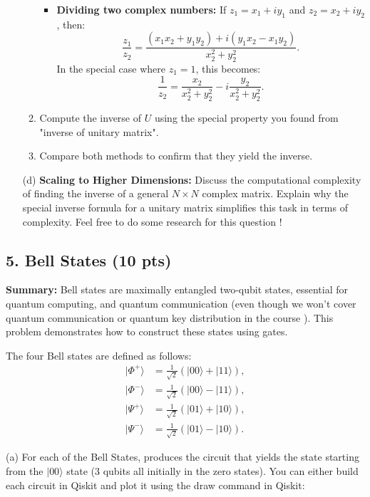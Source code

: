 \documentclass[12pt]{article}
\begin{document}
\begin{enumerate}
\begin{enumerate}
\begin{itemize}
\[            \]
            \item \textbf{Dividing two complex numbers:} If \( z_1 = x_1 + iy_1 \) and \( z_2 = x_2 + iy_2 \), then:
            \[
            \frac{z_1}{z_2} = \frac{(x_1x_2 + y_1y_2) + i(y_1x_2 - x_1y_2)}{x_2^2 + y_2^2}.
            \]
            In the special case where \( z_1 = 1 \), this becomes:
            \[
            \frac{1}{z_2} = \frac{x_2}{x_2^2 + y_2^2} - i\frac{y_2}{x_2^2 + y_2^2}.
            \]
        \end{itemize}
        \item Compute the inverse of \( U \) using the special property you found from "inverse of unitary matrix".
        \item Compare both methods to confirm that they yield the inverse.
    \end{enumerate}

    \item[(d)] \textbf{Scaling to Higher Dimensions:} Discuss the computational complexity of finding the inverse of a general \( N \times N \) complex matrix. Explain why the special inverse formula for a unitary matrix simplifies this task in terms of complexity. Feel free to do some research for this question \smiley{}!
\end{enumerate}

\subsection*{5. Bell States (10 pts)}

\textbf{Summary:} Bell states are maximally entangled two-qubit states, essential for quantum computing,  and quantum communication (even though we won't cover quantum communication or quantum key distribution in the course  \smiley{} ). This problem demonstrates how to construct these states using gates.

The four Bell states are defined as follows:
\begin{align*}
    | \Phi^+ \rangle &= \frac{1}{\sqrt{2}}(|00\rangle + |11\rangle), \\
    | \Phi^- \rangle &= \frac{1}{\sqrt{2}}(|00\rangle - |11\rangle), \\
    | \Psi^+ \rangle &= \frac{1}{\sqrt{2}}(|01\rangle + |10\rangle), \\
    | \Psi^- \rangle &= \frac{1}{\sqrt{2}}(|01\rangle - |10\rangle).
\end{align*}

(a) For each of the Bell States, produces the circuit that yields the state starting from the \(|00\rangle\) state (3 qubits all initially in the zero states). You can either build each circuit in Qiskit and plot it using the draw command in Qiskit:
\\
\end{document}
